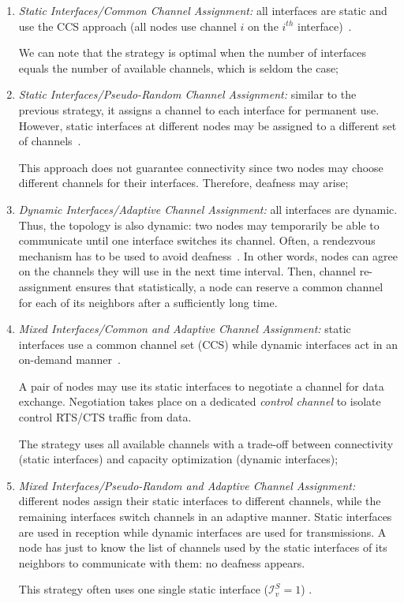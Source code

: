 \documentclass[twoside]{article}
\newcommand{\intf}{\mathcal{I}}
\begin{document}
\begin{enumerate}
	\item \textit{Static Interfaces/Common Channel Assignment:}
all interfaces are static and use the CCS approach (all nodes use channel $i$ on
the $i^{th}$ interface)~\cite{adya04,draves04}. 

We can note that the strategy is optimal when the number of interfaces equals the number 
of available channels, which is seldom the case;



\item \textit{Static Interfaces/Pseudo-Random Channel Assignment:}
similar to the previous strategy, it assigns a channel to each interface for permanent use. 
However, static interfaces at different nodes may be assigned to a different set of channels~\cite{mao07,marina09}.

This approach does not guarantee connectivity since two nodes may choose different channels for their interfaces. Therefore, deafness may arise;



\item \textit{Dynamic Interfaces/Adaptive Channel Assignment:}
all interfaces are dynamic. Thus, the topology is also dynamic:
two nodes may temporarily be able to communicate until one interface switches its channel. 
Often, a rendezvous mechanism has to be used to avoid deafness~\cite{dasilva08,bahl04}. 
In other words, nodes can agree on the channels they will use in the next time interval. Then, channel 
re-assignment ensures that statistically, a node can reserve a common channel for each of its neighbors
after a sufficiently long time. 






\item \textit{Mixed Interfaces/Common and Adaptive Channel Assignment:} 
static interfaces use a common channel set (CCS) while dynamic interfaces act in an on-demand manner~\cite{so04,tseng01}.

A pair of nodes may use its static interfaces to negotiate a channel for data
exchange. 
Negotiation takes place on a dedicated \textit{control channel} to isolate
control RTS/CTS traffic from data.

The strategy uses all available channels with a trade-off between connectivity (static interfaces) 
and capacity optimization (dynamic interfaces);


\item \textit{Mixed Interfaces/Pseudo-Random and Adaptive Channel Assignment:}
\label{sec:strategy5-definition}
different nodes assign their static interfaces to different channels, while the remaining interfaces switch channels in an adaptive manner.
Static interfaces are used in reception while dynamic interfaces are used for transmissions. 
A node has just to know the list of channels used by the static interfaces of its neighbors to communicate with them: no deafness appears. 

This strategy often uses one single static interface ($\intf_{v}^S=1$) \cite{kyasanur05}.

\end{enumerate}
\end{document}

